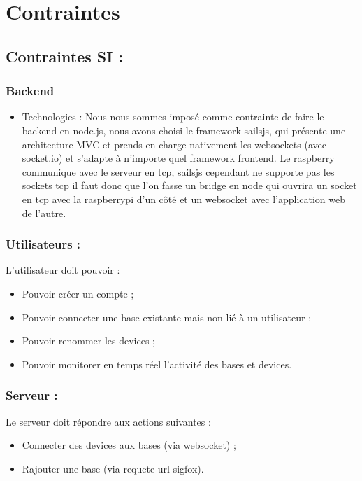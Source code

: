 \chapter{Contraintes}

\section{Contraintes SI :}
\subsection{Backend}
\begin{itemize}
	\item Technologies :
Nous nous sommes imposé comme contrainte de faire le backend en node.js, nous avons choisi le framework sailsjs, qui présente une architecture MVC et prends en charge nativement les websockets (avec socket.io) et s'adapte à n'importe quel framework frontend. Le raspberry communique avec le serveur en tcp, sailsjs cependant ne supporte pas les sockets tcp il faut donc que l'on fasse un bridge en node qui ouvrira un socket en tcp avec la raspberrypi d'un côté et un websocket avec l'application web de l'autre.\\
\end{itemize}

\subsection{Utilisateurs :}
L'utilisateur doit pouvoir :
\begin{itemize}
	\item Pouvoir créer un compte ;
	\item Pouvoir connecter une base existante mais non lié à un utilisateur ;
	\item Pouvoir renommer les devices ;
	\item Pouvoir monitorer en temps réel l'activité des bases et devices.\\
\end{itemize}

\subsection{Serveur :}
Le serveur doit répondre aux actions suivantes :
\begin{itemize}
	\item Connecter des devices aux bases (via websocket) ;
	\item Rajouter une base (via requete url sigfox).\\
\end{itemize}

